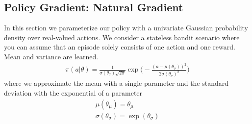 \documentclass{exam}
\begin{document}
\subsection{Policy Gradient: Natural Gradient}
In this section we parameterize our policy with a univariate Gaussian probability density over real-valued actions. We consider a stateless bandit scenario where you can assume that an episode solely consists of one action and one reward. Mean and variance are learned.
\begin{align*}
    \pi(a | \theta) = \frac{1}{\sigma(\theta_{\sigma}) \sqrt{2\pi}} \exp \bigg( - \frac{(a - \mu(\theta_{\sigma}))^2}{2\sigma(\theta_{\sigma})^2} \bigg)
\end{align*}
where we approximate the mean with a single parameter and the standard deviation with the exponential of a parameter
\begin{align*}
    \mu(\theta_{\mu}) = \theta_{\mu}\\
    \sigma(\theta_{\sigma}) = \exp (\theta_{\sigma})
\end{align*}
\end{document}
